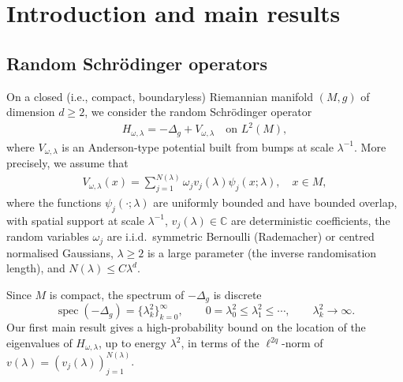 \documentclass[12pt,reqno]{amsart}
\theoremstyle{definition}
\theoremstyle{remark}
\numberwithin{equation}{section}
\newcommand{\1}{\mathbbm{1}}
\DeclareMathOperator{\spec}{spec}
\begin{document}
\section{Introduction and main results}
\subsection{Random Schrödinger operators}
On a closed (i.e., compact, boundaryless) Riemannian manifold $(M,g)$ of dimension $d \geq 2$, we consider the random Schr\"odinger operator
\begin{align}
  H_{\omega,\lambda} = -\Delta_g + V_{\omega,\lambda}
  \quad \text{on } L^2(M),
\end{align}
where $V_{\omega,\lambda}$ is an Anderson-type potential built from bumps at scale $\lambda^{-1}$.
More precisely, we assume that
\begin{align}\label{eq:Anderson-type}
  V_{\omega,\lambda}(x)
  = \sum_{j=1}^{N(\lambda)} \omega_j v_j(\lambda) \psi_j(x;\lambda),
  \quad x \in M,
\end{align}
where the functions $\psi_j(\cdot;\lambda)$ are uniformly bounded and have bounded overlap, with spatial support at scale \(\lambda^{-1}\), $v_j(\lambda) \in \mathbb{C}$ are deterministic coefficients, the random variables $\omega_j$ are i.i.d.~symmetric Bernoulli (Rademacher) or centred normalised Gaussians, $\lambda\geq 2$ is a large parameter (the inverse randomisation length), and $N(\lambda)\leq C\lambda^d$. 

Since $M$ is compact, the spectrum of $-\Delta_g$ is discrete 
\[
\spec(-\Delta_g)=\{\lambda_k^2\}_{k=0}^\infty,
\qquad
0=\lambda_0^2\leq \lambda_1^2\leq \cdots,
\qquad
\lambda_k^2\to \infty.
\]
Our first main result gives a high-probability bound on the location of the eigenvalues of $H_{\omega,\lambda}$, up to energy $\lambda^2$, 
in terms of the \(\ell^{2q}\)-norm of \(v(\lambda)=(v_j(\lambda))_{j=1}^{N(\lambda)}\).
\end{document}

